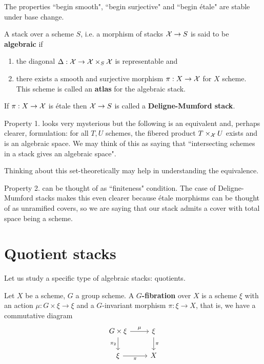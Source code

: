 \begin{remark}
The properties ``begin smooth", ``begin surjective" and ``begin \'etale" are stable under base change.
\end{remark}

\begin{definition}
A stack over a scheme $S$, i.e. a morphism of stacks $\mathcal{X}\to S$ is said to be \textbf{algebraic} if
\begin{enumerate}
\item the diagonal $\Delta:\mathcal{X}\to \mathcal{X}\times_S\mathcal{X}$ is representable and 
\item there exists a smooth and surjective morphism $\pi:X\to \mathcal{X}$ for $X$ scheme. This scheme is called an \textbf{atlas} for the algebraic stack.
\end{enumerate}
If $\pi:X\to \mathcal{X}$ is \'etale then $\mathcal{X}\to S$ is called a \textbf{Deligne-Mumford stack}.
\end{definition}

\begin{remark}
Property 1. looks very mysterious but the following is an equivalent and, perhaps clearer, formulation: for all $T,U$ schemes, the fibered product $T\times_{\mathcal{X}} U$ exists and is an algebraic space. We may think of this as saying that ``intersecting schemes in a stack gives an algebraic space".

Thinking about this set-theoretically may help in understanding the equivalence.
\end{remark}

\begin{remark}
Property 2. can be thought of as ``finiteness" condition. The case of Deligne-Mumford stacks makes this even clearer because \'etale morphisms can be thought of as unramified covers, so we are saying that our stack admits a cover with total space being a scheme.
\end{remark}






\section{Quotient stacks}

Let us study a specific type of algebraic stacks: quotients.

\begin{definition}[$G$-fibration]
Let $X$ be a scheme, $G$ a group scheme. A \textbf{$G$-fibration} over $X$ is a scheme $\xi$ with an action $\mu:G\times \xi\to \xi$ and a $G$-invariant morphism $\pi:\xi\to X$, that is, we have a commutative diagram
\[\begin{tikzcd}
	{G\times \xi} & \xi \\
	\xi & X
	\arrow["\mu", from=1-1, to=1-2]
	\arrow["{\pi_2}"', from=1-1, to=2-1]
	\arrow["\pi", from=1-2, to=2-2]
	\arrow["\pi"', from=2-1, to=2-2]
\end{tikzcd}\]
\end{definition}

